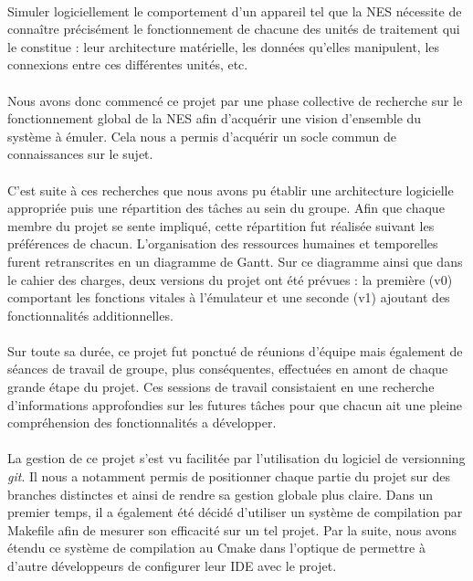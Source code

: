 \paragraph{}

Simuler logiciellement le comportement d'un appareil tel que la NES nécessite de connaître précisément le fonctionnement de chacune des unités de traitement qui le constitue : leur architecture matérielle, les données qu'elles manipulent, les connexions entre ces différentes unités, etc.

\paragraph{}
Nous avons donc commencé ce projet par une phase collective de recherche sur le fonctionnement global de la NES afin d'acquérir une vision d'ensemble du système à émuler. Cela nous a permis d'acquérir un socle commun de connaissances sur le sujet.

\paragraph{}
C'est suite à ces recherches que nous avons pu établir une architecture logicielle appropriée puis une répartition des tâches au sein du groupe. Afin que chaque membre du projet se sente impliqué, cette répartition fut réalisée suivant les préférences de chacun. L'organisation des ressources humaines et temporelles furent retranscrites en un diagramme de Gantt. Sur ce diagramme ainsi que dans le cahier des charges, deux versions du projet ont été prévues : la première (v0) comportant les fonctions vitales à l'émulateur et une seconde (v1) ajoutant des fonctionnalités additionnelles.

\paragraph{}
Sur toute sa durée, ce projet fut ponctué de réunions d'équipe mais également de séances de travail de groupe, plus conséquentes, effectuées en amont de chaque grande étape du projet. Ces sessions de travail consistaient en une recherche d'informations approfondies sur les futures tâches pour que chacun ait une pleine compréhension des fonctionnalités a développer.

\paragraph{}
La gestion de ce projet s'est vu facilitée par l'utilisation du logiciel de versionning \emph{git}. Il nous a notamment permis de positionner chaque partie du projet sur des branches distinctes et ainsi de rendre sa gestion globale plus claire. Dans un premier temps, il a également été décidé d'utiliser un système de compilation par Makefile afin de mesurer son efficacité sur un tel projet. Par la suite, nous avons étendu ce système de compilation au Cmake dans l'optique de permettre à d'autre développeurs de configurer leur IDE avec le projet.

